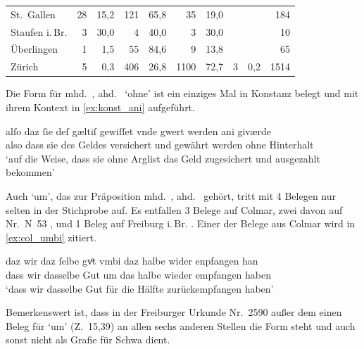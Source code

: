 \begin{table}
\begin{tabular}{
	l @{\qquad}
	r r @{\qquad}
	r r @{\qquad}
	r r @{\qquad}
	r r @{\qquad}
	r}
St.~Gallen
	& 28	& 15,2
	& 121	& 65,8
	& 35	& 19,0
	&		&
	& 184
	\\

Staufen i.\,Br.
	& 3 & 30,0
	& 4	& 40,0
	& 3	& 30,0
	&	&
	& 10
	\\

Überlingen
	& 1		& 1,5	
	& 55	& 84,6
	& 9		& 13,8
	&		&
	& 65
	\\

Zürich
	& 5		& 0,3
	& 406	& 26,8
	& 1100	& 72,7
	& 3		& 0,2
	& 1514
	\\

\bottomrule
\end{tabular}
\label{tab:ispelx}
\end{table}

Die Form  für mhd.~, ahd.~ `ohne' ist ein einziges
Mal in Konstanz belegt und mit ihrem Kontext in \cref{ex:konst_ani} aufgeführt.

\begin{exe}
\ex\label{ex:konst_ani}
	\gll alſo daz ſie deſ gæltiſ gewiſſet vnde gwert werden ani giværde \\
		also dass sie des Geldes versichert und gewährt werden ohne
			Hinterhalt \\
	\trans `auf die Weise, dass sie ohne Arglist das Geld zugesichert und
		ausgezahlt bekommen'
		\parencites(Nr.~17, Konstanz, 1251)[26,22]{cao1}
\end{exe}

Auch  `um', das zur Präposition mhd.~, ahd.~
gehört, tritt mit 4 Belegen nur selten in der Stichprobe auf. Es entfallen 3
Belege auf Colmar, zwei davon auf Nr.~N~53 \autocites(Colmar,
1264)[37,2--17]{cao5}, und 1 Beleg auf Freiburg i.\,Br. \autocites(Nr.~2580,
Freiburg i.\,Br., 1297)[9,21--33]{cao4}. Einer der Belege aus Colmar wird in
\cref{ex:col_umbi} zitiert.

\begin{exe}
\ex\label{ex:col_umbi}
	\gll daz wir {daz ſelbe} gvͦt vmbi daz halbe wider enpfangen han \\
		dass wir dasselbe Gut um das halbe wieder empfangen haben \\
	\trans `dass wir dasselbe Gut für die Hälfte  zurückempfangen haben'
		\parencites(Nr.~N~92, Colmar, 1269)[64,27--28]{cao5}
\end{exe}

Bemerkenswert ist, dass in der Freiburger Urkunde Nr.~2590
\autocite[15,32--16,4]{cao4} außer dem einen Beleg für  `um'
(Z.~15,39) an allen sechs anderen Stellen die Form  steht und 
auch sonst nicht als Grafie für Schwa dient.

